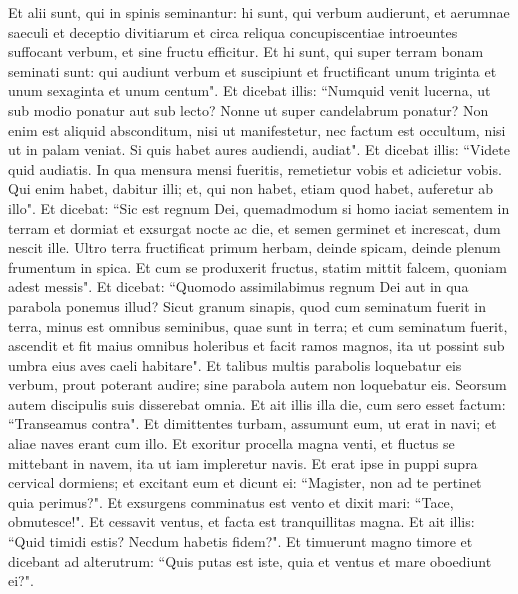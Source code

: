 \begin{biblechapter}
\verse Et alii sunt, qui in spinis seminantur: hi sunt, qui verbum audierunt, 
\verse et aerumnae saeculi et deceptio divitiarum et circa reliqua concupiscentiae introeuntes suffocant verbum, et sine fructu efficitur. 
\verse Et hi sunt, qui super terram bonam seminati sunt: qui audiunt verbum et suscipiunt et fructificant unum triginta et unum sexaginta et unum centum". 
\verse Et dicebat illis: “Numquid venit lucerna, ut sub modio ponatur aut sub lecto? Nonne ut super candelabrum ponatur? 
\verse Non enim est aliquid absconditum, nisi ut manifestetur, nec factum est occultum, nisi ut in palam veniat. 
\verse Si quis habet aures audiendi, audiat". 
\verse Et dicebat illis: “Videte quid audiatis. In qua mensura mensi fueritis, remetietur vobis et adicietur vobis. 
\verse Qui enim habet, dabitur illi; et, qui non habet, etiam quod habet, auferetur ab illo". 
\verse Et dicebat: “Sic est regnum Dei, quemadmodum si homo iaciat sementem in terram 
\verse et dormiat et exsurgat nocte ac die, et semen germinet et increscat, dum nescit ille. 
\verse Ultro terra fructificat primum herbam, deinde spicam, deinde plenum frumentum in spica. 
\verse Et cum se produxerit fructus, statim mittit falcem, quoniam adest messis". 
\verse Et dicebat: “Quomodo assimilabimus regnum Dei aut in qua parabola ponemus illud? 
\verse Sicut granum sinapis, quod cum seminatum fuerit in terra, minus est omnibus seminibus, quae sunt in terra; 
\verse et cum seminatum fuerit, ascendit et fit maius omnibus holeribus et facit ramos magnos, ita ut possint sub umbra eius aves caeli habitare". 
\verse Et talibus multis parabolis loquebatur eis verbum, prout poterant audire;  
\verse sine parabola autem non loquebatur eis. Seorsum autem discipulis suis disserebat omnia. 
\verse Et ait illis illa die, cum sero esset factum: “Transeamus contra". 
\verse Et dimittentes turbam, assumunt eum, ut erat in navi; et aliae naves erant cum illo. 
\verse Et exoritur procella magna venti, et fluctus se mittebant in navem, ita ut iam impleretur navis. 
\verse Et erat ipse in puppi supra cervical dormiens; et excitant eum et dicunt ei: “Magister, non ad te pertinet quia perimus?". 
\verse Et exsurgens comminatus est vento et dixit mari: “Tace, obmutesce!". Et cessavit ventus, et facta est tranquillitas magna. 
\verse Et ait illis: “Quid timidi estis? Necdum habetis fidem?". 
\verse Et timuerunt magno timore et dicebant ad alterutrum: “Quis putas est iste, quia et ventus et mare oboediunt ei?". 
\end{biblechapter}

